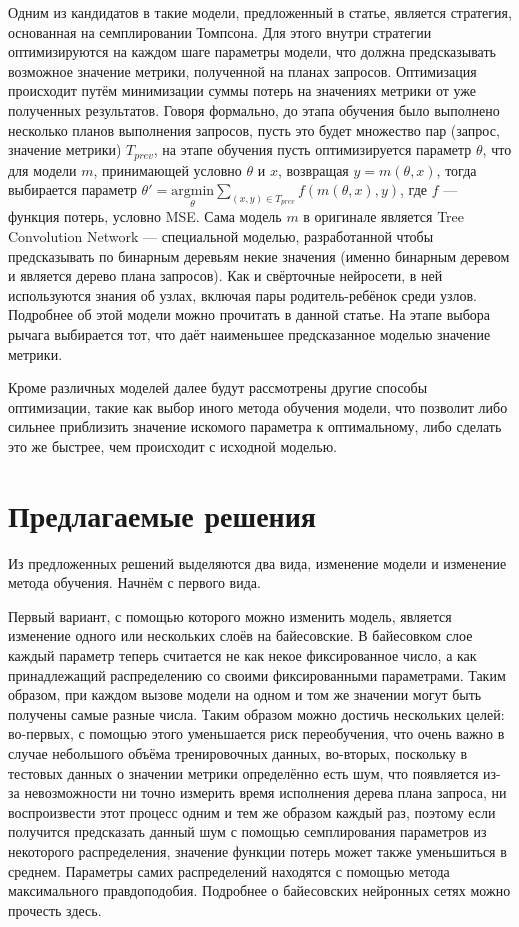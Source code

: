 \documentclass[12pt]{article}
\begin{document}
Одним из кандидатов в такие модели, предложенный в статье, является стратегия, основанная на семплировании Томпсона. Для этого внутри стратегии оптимизируются на каждом шаге параметры модели, что должна предсказывать возможное значение метрики, полученной на планах запросов. Оптимизация происходит путём минимизации суммы потерь на значениях метрики от уже полученных результатов. Говоря формально, до этапа обучения было выполнено несколько планов выполнения запросов, пусть это будет множество пар (запрос, значение метрики) $T_{prev}$, на этапе обучения пусть оптимизируется параметр $\theta$, что для модели $m$, принимающей условно $\theta$ и $x$, возвращая $y = m(\theta, x)$, тогда выбирается параметр $\theta' = \underset{\theta}{\mathrm{argmin}} \sum_{(x, y) \in T_{prev}} f(m(\theta, x), y)$, где $f$ — функция потерь, условно MSE. Сама модель $m$ в оригинале является Tree Convolution Network — специальной моделью, разработанной чтобы предсказывать по бинарным деревьям некие значения (именно бинарным деревом и является дерево плана запросов). Как и свёрточные нейросети, в ней используются знания об узлах, включая пары родитель-ребёнок среди узлов. Подробнее об этой модели можно прочитать в данной статье\cite{tcnn}. На этапе выбора рычага выбирается тот, что даёт наименьшее предсказанное моделью значение метрики.

Кроме различных моделей далее будут рассмотрены другие способы оптимизации, такие как выбор иного метода обучения модели, что позволит либо сильнее приблизить значение искомого параметра к оптимальному, либо сделать это же быстрее, чем происходит с исходной моделью.

\section{Предлагаемые решения}

Из предложенных решений выделяются два вида, изменение модели и изменение метода обучения. Начнём с первого вида.

Первый вариант, с помощью которого можно изменить модель, является изменение одного или нескольких слоёв на байесовские. В байесовком слое каждый параметр теперь считается не как некое фиксированное число, а как принадлежащий распределению со своими фиксированными параметрами. Таким образом, при каждом вызове модели на одном и том же значении могут быть получены самые разные числа. Таким образом можно достичь нескольких целей: во-первых, с помощью этого уменьшается риск переобучения, что очень важно в случае небольшого объёма тренировочных данных, во-вторых, поскольку в тестовых данных о значении метрики определённо есть шум, что появляется из-за невозможности ни точно измерить время исполнения дерева плана запроса, ни воспроизвести этот процесс одним и тем же образом каждый раз, поэтому если получится предсказать данный шум с помощью семплирования параметров из некоторого распределения, значение функции потерь может также уменьшиться в среднем. Параметры самих распределений находятся с помощью метода максимального правдоподобия. Подробнее о байесовских нейронных сетях можно прочесть здесь\cite{bayesian}.
\end{document}
